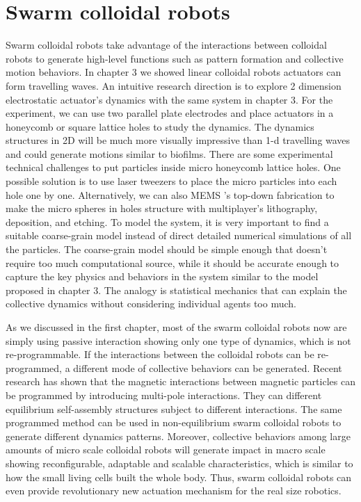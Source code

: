 \section{Swarm colloidal robots}
Swarm colloidal robots take advantage of the interactions between colloidal robots to generate high-level functions such as pattern formation and collective motion behaviors. In chapter 3 we showed linear colloidal robots actuators can form travelling waves. An intuitive research direction is to explore 2 dimension electrostatic actuator's dynamics with the same system in chapter 3. For the experiment, we can use two parallel plate electrodes and place actuators in a honeycomb or square lattice  holes to study the dynamics. The dynamics structures in 2D will be much more visually impressive than  1-d travelling waves and could generate motions similar to biofilms. There are some experimental technical challenges to put particles  inside micro honeycomb lattice holes. One possible solution is to use laser tweezers to place the micro particles into each hole one by one. Alternatively, we can also MEMS 's top-down fabrication to make the micro spheres in  holes structure with multiplayer's lithography, deposition, and etching. To model the system, it is very important to find a suitable coarse-grain model instead of direct detailed numerical simulations of all the particles. The coarse-grain model should be simple enough that doesn't require too much computational source, while it should be accurate enough to capture the key physics and  behaviors in the system similar to the model proposed in chapter 3. The analogy is statistical mechanics that can explain the collective dynamics without considering individual agents too much.

As we discussed in the first chapter, most of the swarm colloidal robots now are simply using passive interaction showing only one type of dynamics, which is not re-programmable. If the interactions between the colloidal robots can be re-programmed, a different mode of collective behaviors can be generated. Recent research has shown that the magnetic interactions between magnetic particles   can be programmed by introducing multi-pole interactions. They can  different  equilibrium self-assembly structures subject to different interactions\autocite{niu2019magnetic}. The same programmed method can be used in non-equilibrium swarm colloidal robots to generate different dynamics patterns. Moreover, collective behaviors among large amounts of micro scale colloidal robots  will generate impact in macro scale showing reconfigurable, adaptable and scalable  characteristics,  which is similar to  how the small living cells built the whole body. Thus, swarm colloidal robots can even provide revolutionary new actuation mechanism for the real size robotics. 
